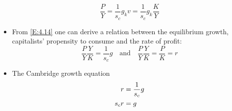\documentclass{article}
\begin{document}
\begin{itemize}
		\begin{equation}
			\frac{P}{Y} = \frac{1}{s_c} g_k v = \frac{1}{s_c} g_k \frac{K}{Y} \label{E:4.14}
		\end{equation}
		\item From \cref{E:4.14} one can derive a relation between the equilibrium growth, capitalists' propensity to consume and the rate of profit:
		\begin{equation}
			\frac{P}{Y}\frac{Y}{K} = \frac{1}{s_c}g
			\quad \text{and} \quad
			\frac{P}{Y}\frac{Y}{K} = \frac{P}{K} = r \label{E:4.15}
		\end{equation}
		\item The Cambridge growth equation
		\begin{align}
			r &=  \frac{1}{s_c}g \notag\\
			s_c r &= g \label{E:4.16}
		\end{align}
	\end{itemize}
\end{document}
